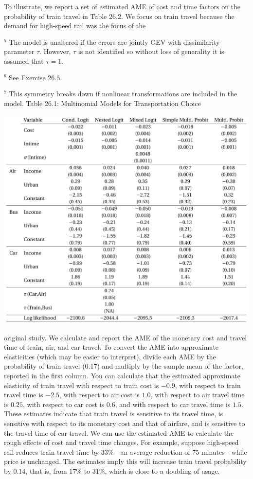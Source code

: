 \documentclass[10pt]{article}
\begin{document}
To illustrate, we report a set of estimated AME of cost and time factors on the probability of train travel in Table 26.2. We focus on train travel because the demand for high-speed rail was the focus of the

${ }^{5}$ The model is unaltered if the errors are jointly GEV with dissimilarity parameter $\tau$. However, $\tau$ is not identified so without loss of generality it is assumed that $\tau=1$.

${ }^{6}$ See Exercise $26.5$.

${ }^{7}$ This symmetry breaks down if nonlinear transformations are included in the model. Table 26.1: Multinomial Models for Transportation Choice

\includegraphics[max width=\textwidth]{2022_10_23_114e68a1ccdd7fb263a3g-07}

original study. We calculate and report the AME of the monetary cost and travel time of train, air, and car travel. To convert the AME into approximate elasticities (which may be easier to interpret), divide each AME by the probability of train travel (0.17) and multiply by the sample mean of the factor, reported in the first column. You can calculate that the estimated approximate elasticity of train travel with respect to train cost is $-0.9$, with respect to train travel time is $-2.5$, with respect to air cost is $1.0$, with respect to air travel time is $0.25$, with respect to car cost is $0.6$, and with respect to car travel time is $1.5$. These estimates indicate that train travel is sensitive to its travel time, is sensitive with respect to its monetary cost and that of airfare, and is sensitive to the travel time of car travel. We can use the estimated AME to calculate the rough effects of cost and travel time changes. For example, suppose high-speed rail reduces train travel time by $33 \%$ - an average reduction of 75 minutes - while price is unchanged. The estimates imply this will increase train travel probability by $0.14$, that is, from $17 \%$ to $31 \%$, which is close to a doubling of usage.
\end{document}
